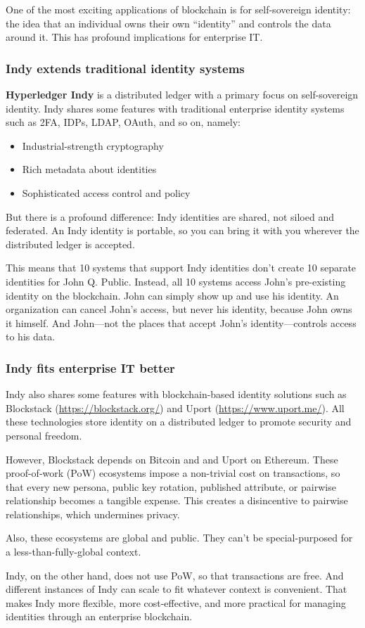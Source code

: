 One of the most exciting applications of blockchain is for self-sovereign identity: the idea that an individual owns their own ``identity'' and controls the data around it. 
This has profound implications for enterprise IT. 

\subsubsection{Indy extends traditional identity systems}
\textbf{Hyperledger Indy} is a distributed ledger with a primary focus on self-sovereign identity.
Indy shares some features with traditional enterprise identity systems such as 2FA, IDPs, LDAP,  OAuth, and so on, namely:
\begin{itemize}
\item Industrial-strength cryptography 
\item Rich metadata about identities
\item Sophisticated access control and policy 
\end{itemize}

But there is a profound difference: Indy identities are shared, not siloed and federated. 
An Indy identity is portable, so you can bring it with you wherever the distributed ledger is accepted. 

This means that 10 systems that support Indy identities don't create 10 separate identities for John Q. Public. 
Instead, all 10 systems access John's pre-existing identity on the blockchain. 
John can simply show up and use his identity. 
An organization can cancel John's access, but never his identity, because John owns it himself. 
And John---not the places that accept John's identity---controls access to his data.

\subsubsection{Indy fits enterprise IT better}
 Indy also shares some features with blockchain-based identity solutions such as Blockstack (\url{https://blockstack.org/}) and Uport (\url{https://www.uport.me/}). 
 All these technologies store identity on a distributed ledger to promote security and personal freedom. 

However, Blockstack depends on Bitcoin and and Uport on Ethereum. These proof-of-work (PoW) ecosystems impose a non-trivial cost on transactions, so that every new persona, public key rotation, published attribute, or pairwise relationship becomes a tangible expense. This creates a disincentive to pairwise relationships, which undermines privacy. 

Also, these ecosystems are global and public. They can't be special-purposed for a less-than-fully-global context. 

Indy, on the other hand, does not use PoW, so that transactions are free. 
And different instances of Indy can scale to fit whatever context is convenient. 
That makes Indy more flexible, more cost-effective, and more practical for managing identities through an enterprise blockchain.  
